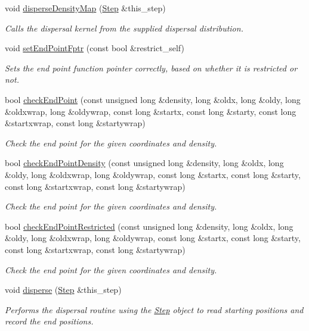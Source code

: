 \begin{DoxyCompactItemize}
void \hyperlink{class_dispersal_coordinator_a79b6018cda012a59f7b80de40b394a6a}{disperse\+Density\+Map} (\hyperlink{struct_step}{Step} \&this\+\_\+step)
\begin{DoxyCompactList}\small\item\em Calls the dispersal kernel from the supplied dispersal distribution. \end{DoxyCompactList}\item 
void \hyperlink{class_dispersal_coordinator_ae72980ec66825c641545675037885248}{set\+End\+Point\+Fptr} (const bool \&restrict\+\_\+self)
\begin{DoxyCompactList}\small\item\em Sets the end point function pointer correctly, based on whether it is restricted or not. \end{DoxyCompactList}\item 
bool \hyperlink{class_dispersal_coordinator_a46fe28ad569bda217e168b33216a888b}{check\+End\+Point} (const unsigned long \&density, long \&oldx, long \&oldy, long \&oldxwrap, long \&oldywrap, const long \&startx, const long \&starty, const long \&startxwrap, const long \&startywrap)
\begin{DoxyCompactList}\small\item\em Check the end point for the given coordinates and density. \end{DoxyCompactList}\item 
bool \hyperlink{class_dispersal_coordinator_a72d8a718590c6dde6f0e8d1ac991d99d}{check\+End\+Point\+Density} (const unsigned long \&density, long \&oldx, long \&oldy, long \&oldxwrap, long \&oldywrap, const long \&startx, const long \&starty, const long \&startxwrap, const long \&startywrap)
\begin{DoxyCompactList}\small\item\em Check the end point for the given coordinates and density. \end{DoxyCompactList}\item 
bool \hyperlink{class_dispersal_coordinator_a055c62c70087ab163bede5c4c4a8be33}{check\+End\+Point\+Restricted} (const unsigned long \&density, long \&oldx, long \&oldy, long \&oldxwrap, long \&oldywrap, const long \&startx, const long \&starty, const long \&startxwrap, const long \&startywrap)
\begin{DoxyCompactList}\small\item\em Check the end point for the given coordinates and density. \end{DoxyCompactList}\item 
void \hyperlink{class_dispersal_coordinator_a08e7c2e1882bd2f83ffd33eed2491fa0}{disperse} (\hyperlink{struct_step}{Step} \&this\+\_\+step)
\begin{DoxyCompactList}\small\item\em Performs the dispersal routine using the \hyperlink{struct_step}{Step} object to read starting positions and record the end positions. \end{DoxyCompactList}\end{DoxyCompactItemize}
